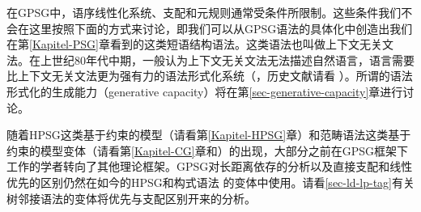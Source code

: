 在GPSG中，语序线性化系统、支配和元规则通常受条件所限制。这些条件我们不会在这里按照下面的方式来讨论，即我们可以从GPSG语法的具体化中创造出我们在第\ref{Kapitel-PSG}章看到的这类短语结构语法。这类语法也叫做上下文无关文法。在上世纪80年代中期，一般认为上下文无关文法无法描述自然语言，语言需要比上下文无关文法更为强有力的语法形式化系统（\citealp{Shieber85a,Culy85a}，历史文献请看 ）。所谓的语法形式化的生成能力（generative capacity）将在第\ref{sec-generative-capacity}章进行讨论。

随着HPSG这类基于约束的模型（请看第\ref{Kapitel-HPSG}章）和范畴语法这类基于约束的模型变体（请看第\ref{Kapitel-CG}章和\citealp{Uszkoreit86d}）的出现，大部分之前在GPSG框架下工作的学者转向了其他理论框架。GPSG对长距离依存的分析以及直接支配和线性优先的区别仍然在如今的HPSG\indexhpsgc 和构式语法\indexcxgc
的变体中使用。请看\ref{sec-ld-lp-tag}有关树邻接语法的变体将优先与支配区别开来的分析。


